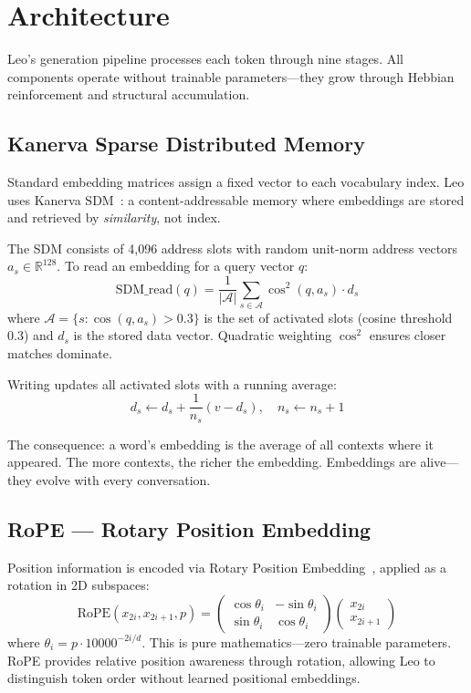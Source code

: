 \documentclass[11pt,twocolumn]{article}
\begin{document}
\section{Architecture}
\label{sec:arch}

Leo's generation pipeline processes each token through nine stages. All components operate without trainable parameters---they grow through Hebbian reinforcement and structural accumulation.

\subsection{Kanerva Sparse Distributed Memory}

Standard embedding matrices assign a fixed vector to each vocabulary index. Leo uses Kanerva SDM~\citep{kanerva1988sparse}: a content-addressable memory where embeddings are stored and retrieved by \textit{similarity}, not index.

The SDM consists of 4,096 address slots with random unit-norm address vectors $a_s \in \mathbb{R}^{128}$. To read an embedding for a query vector $q$:
\begin{equation}
  \text{SDM\_read}(q) = \frac{1}{|\mathcal{A}|} \sum_{s \in \mathcal{A}} \cos^2(q, a_s) \cdot d_s
\end{equation}
where $\mathcal{A} = \{s : \cos(q, a_s) > 0.3\}$ is the set of activated slots (cosine threshold 0.3) and $d_s$ is the stored data vector. Quadratic weighting $\cos^2$ ensures closer matches dominate.

Writing updates all activated slots with a running average:
\begin{equation}
  d_s \leftarrow d_s + \frac{1}{n_s}(v - d_s), \quad n_s \leftarrow n_s + 1
\end{equation}

The consequence: a word's embedding is the average of all contexts where it appeared. The more contexts, the richer the embedding. Embeddings are alive---they evolve with every conversation.

\subsection{RoPE --- Rotary Position Embedding}

Position information is encoded via Rotary Position Embedding~\citep{su2024roformer}, applied as a rotation in 2D subspaces:
\begin{equation}
  \text{RoPE}(x_{2i}, x_{2i+1}, p) = \begin{pmatrix} \cos\theta_i & -\sin\theta_i \\ \sin\theta_i & \cos\theta_i \end{pmatrix} \begin{pmatrix} x_{2i} \\ x_{2i+1} \end{pmatrix}
\end{equation}
where $\theta_i = p \cdot 10000^{-2i/d}$. This is pure mathematics---zero trainable parameters. RoPE provides relative position awareness through rotation, allowing Leo to distinguish token order without learned positional embeddings.
\end{document}
